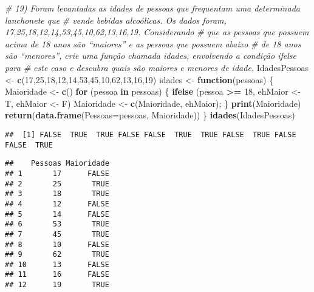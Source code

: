 \documentclass[]{article}
\newenvironment{Shaded}{\begin{snugshade}}{\end{snugshade}}
\newcommand{\CommentTok}[1]{\textcolor[rgb]{0.56,0.35,0.01}{\textit{#1}}}
\newcommand{\ControlFlowTok}[1]{\textcolor[rgb]{0.13,0.29,0.53}{\textbf{#1}}}
\newcommand{\DataTypeTok}[1]{\textcolor[rgb]{0.13,0.29,0.53}{#1}}
\newcommand{\DecValTok}[1]{\textcolor[rgb]{0.00,0.00,0.81}{#1}}
\newcommand{\KeywordTok}[1]{\textcolor[rgb]{0.13,0.29,0.53}{\textbf{#1}}}
\newcommand{\NormalTok}[1]{#1}
\newcommand{\OperatorTok}[1]{\textcolor[rgb]{0.81,0.36,0.00}{\textbf{#1}}}
\newcommand{\StringTok}[1]{\textcolor[rgb]{0.31,0.60,0.02}{#1}}
\begin{document}
\begin{Shaded}
\begin{Highlighting}[]
\CommentTok{# 19) Foram levantadas as idades de pessoas que frequentam uma determinada lanchonete que}
\CommentTok{# vende bebidas alcoólicas. Os dados foram, 17,25,18,12,14,53,45,10,62,13,16,19. Considerando}
\CommentTok{# que as pessoas que possuem acima de 18 anos são “maiores” e as pessoas que possuem abaixo}
\CommentTok{# de 18 anos são “menores”, crie uma função chamada idades, envolvendo a condição ifelse para}
\CommentTok{# este caso e descubra quais são maiores e menores de idade.}
\NormalTok{IdadesPessoas <-}\StringTok{ }\KeywordTok{c}\NormalTok{(}\DecValTok{17}\NormalTok{,}\DecValTok{25}\NormalTok{,}\DecValTok{18}\NormalTok{,}\DecValTok{12}\NormalTok{,}\DecValTok{14}\NormalTok{,}\DecValTok{53}\NormalTok{,}\DecValTok{45}\NormalTok{,}\DecValTok{10}\NormalTok{,}\DecValTok{62}\NormalTok{,}\DecValTok{13}\NormalTok{,}\DecValTok{16}\NormalTok{,}\DecValTok{19}\NormalTok{)}
\NormalTok{idades <-}\StringTok{ }\ControlFlowTok{function}\NormalTok{(pessoas)}
\NormalTok{\{}
\NormalTok{  Maioridade <-}\StringTok{ }\KeywordTok{c}\NormalTok{()}
  \ControlFlowTok{for}\NormalTok{ (pessoa }\ControlFlowTok{in}\NormalTok{ pessoas) \{}
    \KeywordTok{ifelse}\NormalTok{ (pessoa }\OperatorTok{>=}\StringTok{ }\DecValTok{18}\NormalTok{, ehMaior <-}\StringTok{ }\NormalTok{T, ehMaior <-}\StringTok{ }\NormalTok{F)}
\NormalTok{    Maioridade <-}\StringTok{ }\KeywordTok{c}\NormalTok{(Maioridade, ehMaior);}
\NormalTok{  \}}
  \KeywordTok{print}\NormalTok{(Maioridade)}
  \KeywordTok{return}\NormalTok{(}\KeywordTok{data.frame}\NormalTok{(}\DataTypeTok{Pessoas=}\NormalTok{pessoas, Maioridade))}
\NormalTok{\}}
\KeywordTok{idades}\NormalTok{(IdadesPessoas)}
\end{Highlighting}
\end{Shaded}

\begin{verbatim}
##  [1] FALSE  TRUE  TRUE FALSE FALSE  TRUE  TRUE FALSE  TRUE FALSE FALSE  TRUE
\end{verbatim}

\begin{verbatim}
##    Pessoas Maioridade
## 1       17      FALSE
## 2       25       TRUE
## 3       18       TRUE
## 4       12      FALSE
## 5       14      FALSE
## 6       53       TRUE
## 7       45       TRUE
## 8       10      FALSE
## 9       62       TRUE
## 10      13      FALSE
## 11      16      FALSE
## 12      19       TRUE
\end{verbatim}
\end{document}
